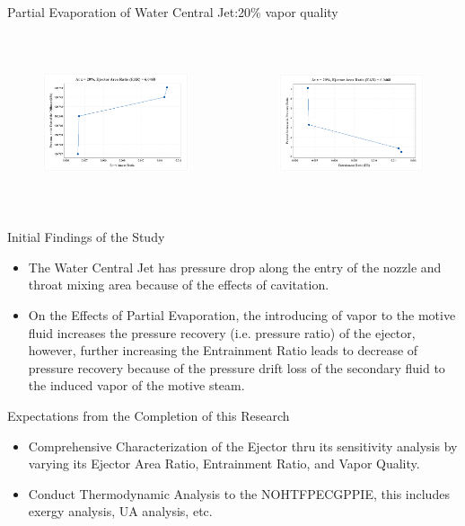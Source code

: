\begin{frame}{Partial Evaporation of Water Central Jet:20\% vapor quality}
  \begin{columns}
    \begin{figure}
        \centering
        \includegraphics[height=4.5cm]{images/pe20vqpdvser.png}
    \end{figure}
    \begin{figure}
        \centering
        \includegraphics[height=4.5cm]{images/pe20vqpercentincpr.png}
    \end{figure}
  \end{columns}
\end{frame}

\begin{frame}{Initial Findings of the Study}
    \begin{itemize}
        \item The Water Central Jet has pressure drop along the entry of the nozzle and throat mixing area because of the effects of cavitation.
        \item On the Effects of Partial Evaporation, the introducing of vapor to the motive fluid increases the pressure recovery (i.e. pressure ratio) of the ejector, however, further increasing the Entrainment Ratio leads to decrease of pressure recovery because of the pressure drift loss of the secondary fluid to the induced vapor of the motive steam.
    \end{itemize}
\end{frame}

\begin{frame}{Expectations from the Completion of this Research}
    \begin{itemize}
        \item Comprehensive Characterization of the Ejector thru its sensitivity analysis by varying its Ejector Area Ratio, Entrainment Ratio, and Vapor Quality.
        \item Conduct Thermodynamic Analysis to the NOHTFPECGPPIE, this includes exergy analysis, UA analysis, etc.
    \end{itemize}
\end{frame}